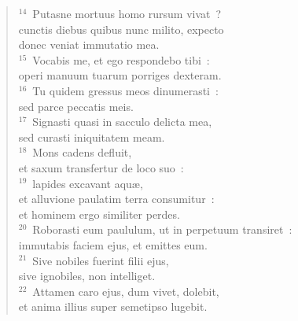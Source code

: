 \begin{flushleft}
\begin{verse}
${}^{14}$~Putasne mortuus homo rursum vivat~?\\ cunctis diebus quibus nunc milito, expecto\\ donec veniat immutatio mea.\\
${}^{15}$~Vocabis me, et ego respondebo tibi~:\\ operi manuum tuarum porriges dexteram.\\
${}^{16}$~Tu quidem gressus meos dinumerasti~:\\ sed parce peccatis meis.\\
${}^{17}$~Signasti quasi in sacculo delicta mea,\\ sed curasti iniquitatem meam.\\
${}^{18}$~Mons cadens defluit,\\ et saxum transfertur de loco suo~:\\
${}^{19}$~lapides excavant aqu\ae ,\\ et alluvione paulatim terra consumitur~:\\ et hominem ergo similiter perdes.\\
${}^{20}$~Roborasti eum paululum, ut in perpetuum transiret~:\\ immutabis faciem ejus, et emittes eum.\\
${}^{21}$~Sive nobiles fuerint filii ejus,\\ sive ignobiles, non intelliget.\\
${}^{22}$~Attamen caro ejus, dum vivet, dolebit,\\ et anima illius super semetipso lugebit.\end{verse}\end{flushleft}


